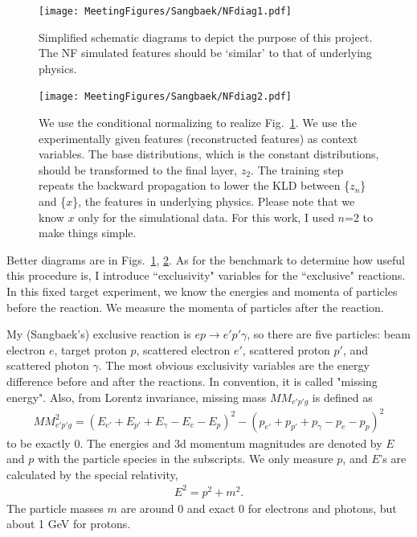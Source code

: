 \begin{figure}[!ht]
    \centering
    \texttt{[image: MeetingFigures/Sangbaek/NFdiag1.pdf]}
    \caption{Simplified schematic diagrams to depict the purpose of this project. The NF simulated features should be `similar' to that of underlying physics.}
    \label{fig:goal}
\end{figure}
\begin{figure}[!ht]
    \centering
    \texttt{[image: MeetingFigures/Sangbaek/NFdiag2.pdf]}
    \caption{We use the conditional normalizing to realize Fig.~\ref{fig:goal}. We use the experimentally given features (reconstructed features) as context variables. The base distributions, which is the constant distributions, should be transformed to the final layer, $z_2$. The training step repeats the backward propagation to lower the KLD between \{$z_n$\} and \{$x$\}, the features in underlying physics. Please note that we know $x$ only for the simulational data. For this work, I used $n$=2 to make things simple.}
    \label{fig:architecture}
\end{figure}

Better diagrams are in Figs.~\ref{fig:goal}, \ref{fig:architecture}. As for the benchmark to determine how useful this procedure is, I introduce ``exclusivity" variables for the ``exclusive" reactions. In this fixed target experiment, we know the energies and momenta of particles before the reaction. We measure the momenta of particles after the reaction.

My (Sangbaek's) exclusive reaction is $ep\rightarrow e'p'\gamma$, so there are five particles: beam electron $e$, target proton $p$, scattered electron $e'$, scattered proton $p'$, and scattered photon $\gamma$. The most obvious exclusivity variables are the energy difference before and after the reactions. In convention, it is called "missing energy". Also, from Lorentz invariance, missing mass $MM_{e'p'g}$ is defined as
\begin{align}
    MM_{e'p'g}^2 = (E_{e'}+E_{p'}+E_\gamma - E_e - E_p)^2 - (p_{e'}+p_{p'}+p_\gamma - p_e - p_p)^2
\end{align}
to be exactly 0. The energies and 3d momentum magnitudes are denoted by $E$ and $p$ with the particle species in the subscripts. We only measure $p$, and $E$'s are calculated by the special relativity,
\begin{align}
    E^2 = p^2 + m^2.
\end{align}
The particle masses $m$ are around 0 and exact 0 for electrons and photons, but about 1 GeV for protons.

